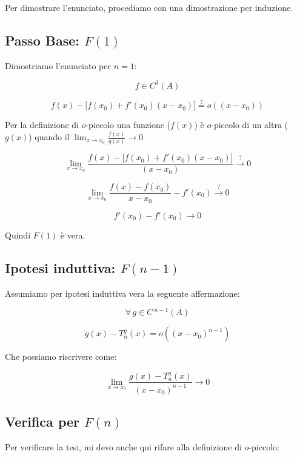 \documentclass[../dimostrazioni]{subfiles}
\begin{document}
        Per dimostrare l'enunciato, procediamo con una dimostrazione per induzione.

        \medskip

        \subsection*{Passo Base: \(F(1)\)}

        Dimostriamo l'enunciato per \(n = 1\):
        
        \[  f \in C^1(A)  \]

        \[  f(x) - \bigg[ f(x_0) + f'(x_0)(x-x_0) \bigg] \stackrel{?}{=}  o ((x-x_0))  \]

        Per la definizione di \(o\)-piccolo una funzione (\(f(x)\)) è \(o\)-piccolo di un altra (\(g(x)\)) quando il \( \lim_{x \to x_0} \frac{f(x)}{g(x)} \rightarrow 0\) 
        
        \[    \lim_{x \to x_0} \frac{f(x) - \bigg[ f(x_0) + f'(x_0)(x-x_0) \bigg]}{(x-x_0)} \stackrel{?}{\rightarrow} 0 \]
            
        \[    \lim_{x \to x_0} \frac{f(x) - f(x_0)}{x - x_0} - f'(x_0) \stackrel{?}{\rightarrow} 0 \]

        \[    f'(x_0) - f'(x_0) \rightarrow 0 \]

        Quindi \(F(1)\) è vera. 

        \subsection*{Ipotesi induttiva: \(F(n-1)\)}

        Assumiamo per ipotesi induttiva vera la seguente affermazione:
        
        \[  \forall \, g \in C\,^{n-1} (A) \]

        \[  g(x) - T _n ^ g (x) = o ((x-x_0)^{n-1}) \]

        Che possiamo riscrivere come:

        \[  \lim_{x \to x_0} \frac{g(x) - T _n ^ g (x)}{(x-x_0)^{n-1}} \rightarrow 0 \]

        \subsection*{Verifica per \(F(n)\)}

        Per verificare la tesi, mi devo anche qui rifare alla definizione di \(o\)-piccolo:
        
\end{document}
